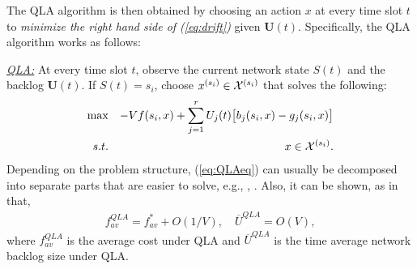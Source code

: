 \documentclass[journal]{IEEEtran}
\newcommand{\bv}[1]{{\boldsymbol{#1} }}
\newcommand{\script}[1]{{{\cal{#1} }}}
\begin{document}
The QLA algorithm is then obtained by choosing an action $x$ at every time slot $t$ to \emph{minimize the right hand side of (\ref{eq:drift})} given $\bv{U}(t)$. Specifically, the QLA algorithm works as follows: 


\underline{\emph{QLA:}} At every time slot $t$, observe the current network state $S(t)$ and the backlog $\bv{U}(t)$. If $S(t)=s_i$, choose $x^{(s_i)}\in\script{X}^{(s_i)}$ that solves the following: 
\begin{eqnarray}
\max && -Vf(s_i, x)+\sum_{j=1}^{r}U_j(t)\big[b_j(s_i, x)-g_j(s_i, x)\big]\label{eq:QLAeq}\\
s.t. && x\in\script{X}^{(s_i)}.\nonumber
\end{eqnarray}
Depending on the problem structure, (\ref{eq:QLAeq}) can usually be decomposed into separate parts that are easier to solve, e.g., \cite{neelyenergy}, \cite{huangneelypricing}. 
Also, it can be shown, as in \cite{neelynowbook} that, %
\begin{eqnarray}
f_{av}^{QLA}=f^*_{av}+O(1/V),\quad \overline{U}^{QLA}=O(V),\label{eq:qla_performance}
\end{eqnarray}
where $f_{av}^{QLA}$ is the average cost under QLA and $\overline{U}^{QLA}$ is the time average network backlog size under QLA. 
 
\end{document}
